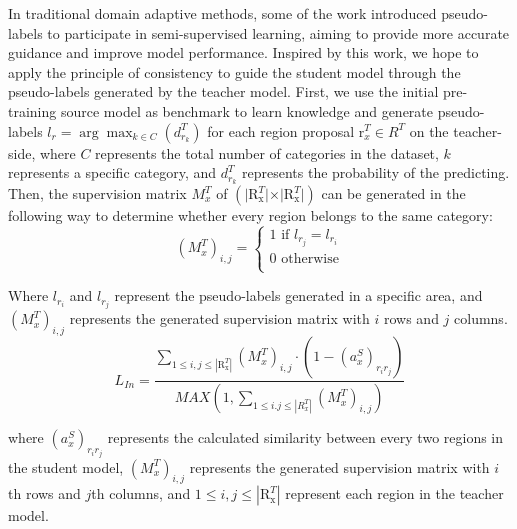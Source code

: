 \documentclass[sn-mathphys]{sn-jnl}%
\theoremstyle{thmstyleone}%
\theoremstyle{thmstyletwo}%
\theoremstyle{thmstylethree}%
\begin{document}
In traditional domain adaptive methods, some of the work introduced pseudo-labels to participate in semi-supervised learning, aiming to provide more accurate guidance and improve model performance. Inspired by this work, we hope to apply the principle of consistency to guide the student model through the pseudo-labels generated by the teacher model. First, we use the initial pre-training source model as benchmark to learn knowledge and generate pseudo-labels ${{l}_{r}}=\arg {{\max }_{k\in C}}\left( d_{{{r}_{k}}}^{T} \right)$ for each region proposal $\text{r}_{x}^{T}\in {{R}^{T}}$ on the teacher-side, where $C$ represents the total number of categories in the dataset, $k$ represents a specific category, and $d_{{{r}_{k}}}^{T}$ represents the probability of the predicting. Then, the supervision matrix $M_{x}^{T}$ of  $(\vert\text{R}_{\text{x}}^{T}\vert \times \vert\text{R}_{\text{x}}^{T}\vert)$ can be generated in the following way to determine whether every region belongs to the same category: 
\begin{equation}
{{(M_{x}^{T})}_{i,j}}=\left\{ \begin{matrix}
1\text{     if  }{{l}_{{{r}_{j}}}}={{l}_{{{r}_{i}}}}  \\
0\text{    otherwise}  \\
\end{matrix} \right.
\label{eq:08}
\end{equation}

Where ${{l}_{{{r}_{i}}}}$ and ${{l}_{{{r}_{j}}}}$ represent the pseudo-labels generated in a specific area, and ${{(M_{x}^{T})}_{i,j}}$ represents the generated supervision matrix with $i$ rows and $j$ columns.
\begin{equation}
{{L}_{In}}=\frac{\sum\limits_{1\le i,j\le \left\vert \text{R}_{\text{x}}^{T} \right\vert}{{{\left( M_{x}^{T} \right)}_{i,j}}\cdot \left( 1-{{\left( a_{x}^{S} \right)}_{{{r}_{i}}{{r}_{j}}}} \right)}}{MAX\left( 1,\sum\limits_{1\le i.j\le \left\vert R_{x}^{T} \right\vert}{{{\left( M_{x}^{T} \right)}_{i,j}}} \right)}
\label{eq:09}
\end{equation}

where ${{\left( a_{x}^{S} \right)}_{{{r}_{i}}{{r}_{j}}}}$ represents the calculated similarity between every two regions in the student model, ${{\left( M_{x}^{T} \right)}_{i,j}}$ represents the generated supervision matrix with $i$th rows and $j$th columns, and $1\le i,j\le \left\vert \text{R}_{\text{x}}^{T} \right\vert$ represent each region in the teacher model.

%
%
\end{document}
